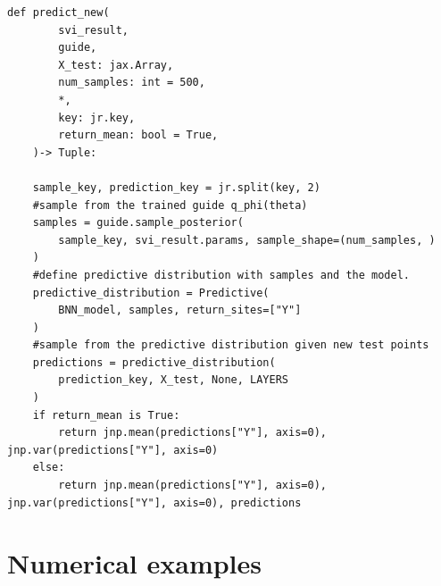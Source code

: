 \documentclass{article}
\begin{document}
\begin{lstlisting}
def predict_new(
        svi_result,
        guide,
        X_test: jax.Array,
        num_samples: int = 500,
        *,
        key: jr.key,
        return_mean: bool = True,
    )-> Tuple:
    
    sample_key, prediction_key = jr.split(key, 2)
    #sample from the trained guide q_phi(theta)
    samples = guide.sample_posterior(
        sample_key, svi_result.params, sample_shape=(num_samples, )
    )
    #define predictive distribution with samples and the model.
    predictive_distribution = Predictive(
        BNN_model, samples, return_sites=["Y"]
    )
    #sample from the predictive distribution given new test points
    predictions = predictive_distribution(
        prediction_key, X_test, None, LAYERS
    )
    if return_mean is True:
        return jnp.mean(predictions["Y"], axis=0), jnp.var(predictions["Y"], axis=0)
    else:
        return jnp.mean(predictions["Y"], axis=0), jnp.var(predictions["Y"], axis=0), predictions
\end{lstlisting}

\section{Numerical examples}
\end{document}
